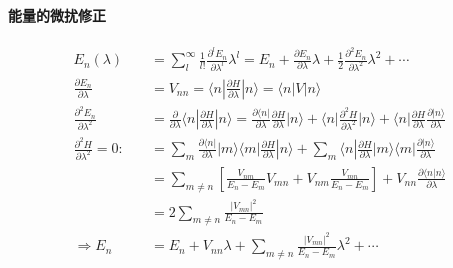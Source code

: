 \documentclass[../../main.tex]{subfiles}
\begin{document}
\paragraph{能量的微扰修正}
\begin{align*}
    E_{n}(\lambda) &= \sum_{l}^{\infty}\frac{1}{l!}\frac{\partial^{l}E_{n}}{\partial\lambda^{l}}\lambda^{l} = E_{n} + \frac{\partial E_{n}}{\partial\lambda}\lambda + \frac{1}{2}\frac{\partial^{2}E_{n}}{\partial\lambda^{2}}\lambda^{2} + \cdots\\
    \frac{\partial E_{n}}{\partial\lambda} &= V_{nn} = \langle n|\frac{\partial H}{\partial\lambda}|n\rangle = \langle n|V|n\rangle\\
    \frac{\partial^{2}E_{n}}{\partial\lambda^{2}} &= \frac{\partial}{\partial\lambda}\langle n|\frac{\partial H}{\partial\lambda}|n\rangle 
    = \frac{\partial\langle n|}{\partial\lambda}\frac{\partial H}{\partial\lambda}|n\rangle + \langle n|\frac{\partial^{2}H}{\partial\lambda^{2}}|n\rangle + \langle n|\frac{\partial H}{\partial\lambda}\frac{\partial|n\rangle}{\partial\lambda}\\
    \frac{\partial^{2}H}{\partial\lambda^{2}}=0:\quad &= \sum_{m}\frac{\partial\langle n|}{\partial\lambda}|m\rangle\langle m|\frac{\partial H}{\partial\lambda}|n\rangle + \sum_{m}\langle n|\frac{\partial H}{\partial\lambda}|m\rangle\langle m|\frac{\partial|n\rangle}{\partial\lambda}\\
    &= \sum_{m\neq n}\left[\frac{V_{nm}}{E_{n}-E_{m}}V_{mn} + V_{nm}\frac{V_{mn}}{E_{n}-E_{m}}\right] + V_{nn}\frac{\partial\langle n|n\rangle}{\partial\lambda}\\
    &= 2\sum_{m\neq n}\frac{|V_{mn}|^{2}}{E_{n}-E_{m}}\\
    \Rightarrow E_{n} &= E_{n} + V_{nn}\lambda + \sum_{m\neq n}\frac{|V_{mn}|^{2}}{E_{n}-E_{m}}\lambda^{2} + \cdots
\end{align*}
\end{document}
